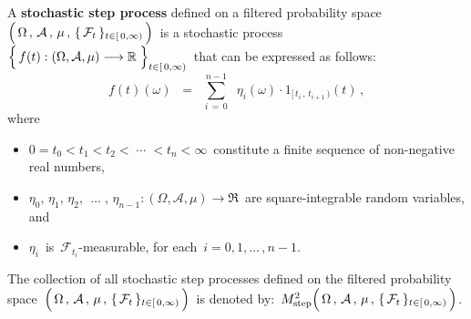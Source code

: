 \vskip 0.3cm
\begin{definition}
\mbox{}
\vskip 0.1cm
\noindent
A \textbf{stochastic step process} defined on a filtered probability space
\,$\left(\,\overset{{\color{white}.}}{\Omega} \,,\, \mathcal{A} \,,\, \mu \,,\, \{\,\mathcal{F}_{t}\,\}_{t \in [\,0,\infty)} \,\right)$\,
is a stochastic process
\,$\left\{\,\overset{{\color{white}.}}{f}(t) : (\Omega,\mathcal{A},\mu) \longrightarrow \Re \;\right\}_{t \in[\,0,\infty)}$\,
that can be expressed as follows:
\begin{equation*}
f(t)(\omega)
\;\; = \;\;
	\overset{n-1}{\underset{i\,=\,0}{\sum}}\;\;
	\eta_{i}(\omega) \cdot 1_{[\,t_{i}\,,\,t_{i+1}\,)}(t)\,,
\end{equation*}
where
\begin{itemize}
\item
	$0 = t_{0} < t_{1} < t_{2} < \;\cdots\; < t_{n} < \infty$\,
	constitute a finite sequence of non-negative real numbers, 
\item
	$\eta_{0},\, \eta_{1},\, \eta_{2},\, \;\ldots\; ,\, \eta_{n-1} : (\Omega,\mathcal{A},\mu) \longrightarrow \Re$\,
	are square-integrable random variables, and
\item
	$\eta_{i}$\, is \,$\mathcal{F}_{t_{i}}$-measurable, for each \,$i = 0, 1, \ldots\,, n-1$.
\end{itemize}
The collection of all stochastic step processes defined on
the filtered probability space
\,$\left(\,\overset{{\color{white}.}}{\Omega} \,,\, \mathcal{A} \,,\, \mu \,,\, \{\,\mathcal{F}_{t}\,\}_{t \in [\,0,\infty)} \,\right)$\,
is denoted by:
\,$M^{2}_{\textnormal{step}}\!
\left(\,
	\overset{{\color{white}.}}{\Omega} \,,\, \mathcal{A} \,,\, \mu \,,\, \{\,\mathcal{F}_{t}\,\}_{t \in [\,0,\infty)}
	\,\right)$.
\end{definition}


